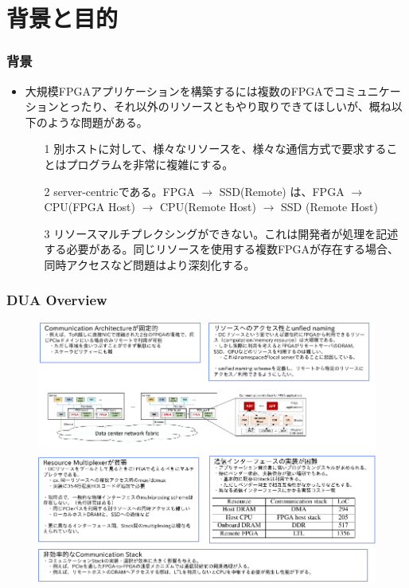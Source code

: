 \documentclass[dvipdfmx,9pt,notheorems]{beamer}
\theoremstyle{definition}
\begin{document}
\section{背景と目的}
\begin{frame}\frametitle{背景}
\begin{itemize}
	\item 大規模FPGAアプリケーションを構築するには複数のFPGAでコミュニケーションとったり、それ以外のリソースともやり取りできてほしいが、概ね以下のような問題がある。
	\begin{itemize}
		\item[1] 別ホストに対して、様々なリソースを、様々な通信方式で要求することはプログラムを非常に複雑にする。
		\item[2] server-centricである。FPGA $\rightarrow$ SSD(Remote) は、FPGA $\rightarrow$ CPU(FPGA Host) $\rightarrow$ CPU(Remote Host) $\rightarrow$ SSD (Remote Host)
		\item[3] リソースマルチプレクシングができない。これは開発者が処理を記述する必要がある。同じリソースを使用する複数FPGAが存在する場合、同時アクセスなど問題はより深刻化する。
	\end{itemize}
\end{itemize}
\pnote{
}
\end{frame}

\begin{frame}\frametitle{DUA Overview}
  \begin{figure}[htb]
		\includegraphics[width=\linewidth]{fig/ez_FPGA_DC_Legacy.pdf}
  \end{figure}
\pnote{
}
\end{frame}
\end{document}
